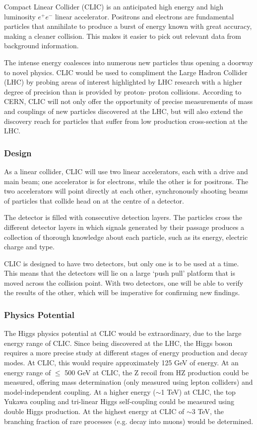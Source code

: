 Compact Linear Collider (CLIC) is an anticipated high energy and high luminosity $e^+ e^-$ linear accelerator. Positrons and electrons are fundamental particles that annihilate to produce a burst of energy known with great accuracy, making a cleaner collision. This makes it easier to pick out relevant data from background information.

The intense energy coalesces into numerous new particles thus opening a doorway to novel physics. CLIC would be used to compliment the Large Hadron Collider (LHC) by probing areas of interest highlighted by LHC research with a higher degree of precision than is provided by proton- proton collisions. According to CERN, CLIC will not only offer the opportunity of precise measurements of mass and couplings of new particles discovered at the LHC, but will also extend the discovery reach for particles that suffer from low production cross-section at the LHC. \cite{LHC:CP:Higgs}

\subsubsection{Design}

As a linear collider, CLIC will use two linear accelerators, each with a drive and main beam; one accelerator is for electrons, while the other is for positrons. The two accelerators will point directly at each other, synchronously shooting beams of particles that collide head on at the centre of a detector.

The detector is filled with consecutive detection layers. The particles cross the different detector layers in which signals generated by their passage produces a collection of thorough knowledge about each particle, such as its energy, electric charge and type.

CLIC is designed to have two detectors, but only one is to be used at a time. This means that the detectors will lie on a large `push \textendash pull' platform that is moved across the collision point. With two detectors, one will be able to verify the results of the other, which will be imperative for confirming new findings.

\subsubsection{Physics Potential}
 
The Higgs physics potential at CLIC would be extraordinary, due to the large energy range of CLIC. Since being discovered at the LHC, the Higgs boson requires a more precise study at different stages of energy production and decay modes. At CLIC, this would require approximately 125 GeV of energy. At an energy range of $\leq$ 500 GeV at CLIC, the Z recoil from HZ production could be measured, offering mass determination (only measured using lepton colliders) and model-independent coupling. At a higher energy ($\sim$1 TeV) at CLIC, the top Yukawa coupling and tri-linear Higgs self-coupling could be measured using double Higgs production.
At the highest energy at CLIC of $\sim$3 TeV, the branching fraction of rare processes (e.g. decay into muons) would be determined.
 
